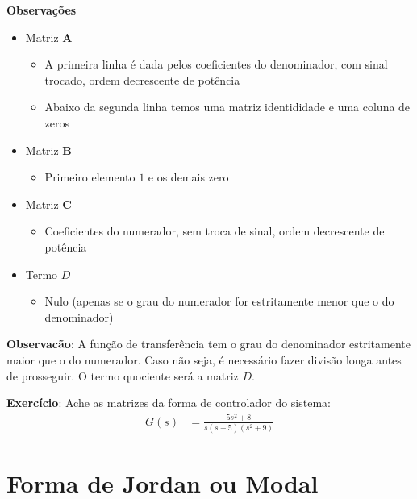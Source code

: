 \documentclass[
]{book}
\providecommand{\tightlist}{%
  \setlength{\itemsep}{0pt}\setlength{\parskip}{0pt}}
\begin{document}
\textbf{Observações}

\begin{itemize}
\tightlist
\item
  Matriz \(\mathbf{A}\)

  \begin{itemize}
  \tightlist
  \item
    A primeira linha é dada pelos coeficientes do denominador, com sinal trocado, ordem decrescente de potência
  \item
    Abaixo da segunda linha temos uma matriz identididade e uma coluna de zeros
  \end{itemize}
\item
  Matriz \(\mathbf{B}\)

  \begin{itemize}
  \tightlist
  \item
    Primeiro elemento \(1\) e os demais zero
  \end{itemize}
\item
  Matriz \(\mathbf{C}\)

  \begin{itemize}
  \tightlist
  \item
    Coeficientes do numerador, sem troca de sinal, ordem decrescente de potência
  \end{itemize}
\item
  Termo \(D\)

  \begin{itemize}
  \tightlist
  \item
    Nulo (apenas se o grau do numerador for estritamente menor que o do denominador)
  \end{itemize}
\end{itemize}

\textbf{Observacão}: A função de transferência tem o grau do denominador estritamente maior que o do numerador. Caso não seja, é necessário fazer divisão longa antes de prosseguir. O termo quociente será a matriz \(D\).

\textbf{Exercício}: Ache as matrizes da forma de controlador do sistema:
\[
\begin{aligned}
    G(s) &= \frac{5s^2+8}{s(s+5)(s^2+9)}
\end{aligned}
\]

\hypertarget{forma-de-jordan-ou-modal}{%
\section{Forma de Jordan ou Modal}\label{forma-de-jordan-ou-modal}}
\end{document}
